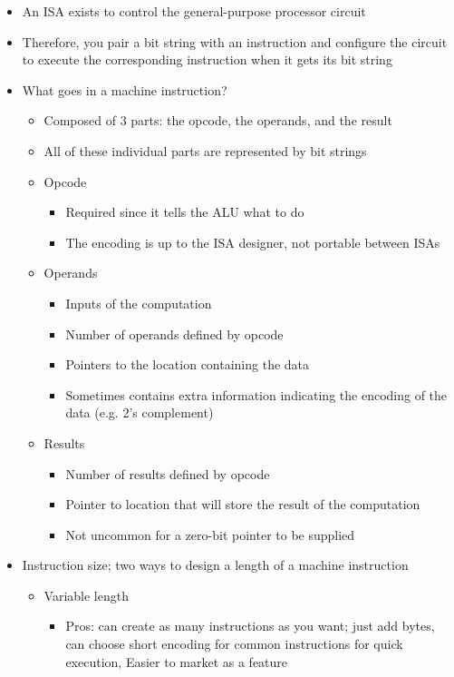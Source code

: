 \documentclass{article}
\begin{document}
\begin{itemize}
\begin{itemize}
		\end{itemize}
	\item An ISA exists to control the general-purpose processor circuit
	\item Therefore, you pair a bit string with an instruction and configure the circuit to execute the corresponding instruction when it gets its bit string
	\item What goes in a machine instruction?
		\begin{itemize}
			\item Composed of 3 parts: the opcode, the operands, and the result
			\item All of these individual parts are represented by bit strings
			\item Opcode
				\begin{itemize}
					\item Required since it tells the ALU what to do
					\item The encoding is up to the ISA designer, not portable between ISAs
				\end{itemize}
			\item Operands
				\begin{itemize}
					\item Inputs of the computation
					\item Number of operands defined by opcode
					\item Pointers to the location containing the data
					\item Sometimes contains extra information indicating the encoding of the data (e.g. 2's complement)
				\end{itemize}
			\item Results
				\begin{itemize}
					\item Number of results defined by opcode
					\item Pointer to location that will store the result of the computation
					\item Not uncommon for a zero-bit pointer to be supplied
				\end{itemize}
		\end{itemize}
	\item Instruction size; two ways to design a length of a machine instruction
		\begin{itemize}
			\item Variable length
				\begin{itemize}
					\item Pros: can create as many instructions as you want; just add bytes, can choose short encoding for common instructions for quick execution, Easier to market as a feature

\end{itemize}
\end{itemize}
\end{itemize}
\end{document}
